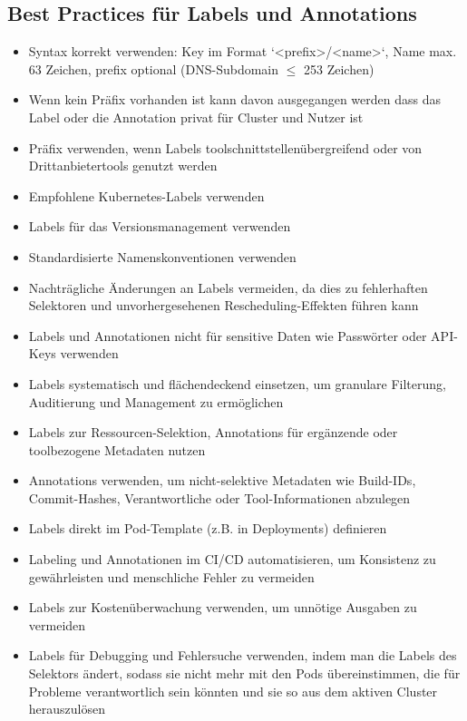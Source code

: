 \subsection{Best Practices für Labels und Annotations}
\begin{itemize}
    \item Syntax korrekt verwenden: Key im Format `<prefix>/<name>`, Name max. 63 Zeichen, prefix optional (DNS-Subdomain $\leq$ 253 Zeichen)
    \item Wenn kein Präfix vorhanden ist kann davon ausgegangen werden dass das Label oder die Annotation privat für Cluster und Nutzer ist
    \item Präfix verwenden, wenn Labels toolschnittstellenübergreifend oder von Drittanbietertools genutzt werden
    \item Empfohlene Kubernetes-Labels verwenden
    \item Labels für das Versionsmanagement verwenden
    \item Standardisierte Namenskonventionen verwenden
    \item Nachträgliche Änderungen an Labels vermeiden, da dies zu fehlerhaften Selektoren und unvorhergesehenen Rescheduling-Effekten führen kann
    \item Labels und Annotationen nicht für sensitive Daten wie Passwörter oder API-Keys verwenden
    \item Labels systematisch und flächendeckend einsetzen, um granulare Filterung, Auditierung und Management zu ermöglichen
    \item Labels zur Ressourcen-Selektion, Annotations für ergänzende oder toolbezogene Metadaten nutzen
    \item Annotations verwenden, um nicht-selektive Metadaten wie Build-IDs, Commit-Hashes, Verantwortliche oder Tool-Informationen abzulegen
    \item Labels direkt im Pod-Template (z.B. in Deployments) definieren
    \item Labeling und Annotationen im CI/CD automatisieren, um Konsistenz zu gewährleisten und menschliche Fehler zu vermeiden
    \item Labels zur Kostenüberwachung verwenden, um unnötige Ausgaben zu vermeiden
    \item Labels für Debugging und Fehlersuche verwenden, indem man die Labels des Selektors ändert, sodass sie nicht mehr mit den Pods übereinstimmen, die für Probleme verantwortlich sein könnten und sie so aus dem aktiven Cluster herauszulösen
\end{itemize}

